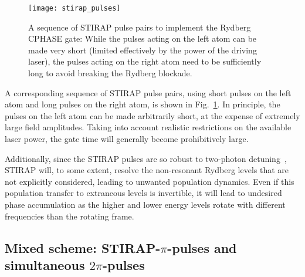 \begin{figure}[tb]
    \centering\texttt{[image: stirap\_pulses]}
  \caption{%
    A sequence of STIRAP pulse pairs to implement the
    Rydberg CPHASE gate: While the pulses acting on the left atom
    can be made very short (limited effectively by the power of the driving
    laser), the pulses acting on the right atom need to be sufficiently long to
    avoid breaking the Rydberg blockade.
  }
  \label{fig:Stirap}
\end{figure}
A corresponding  sequence of STIRAP pulse pairs, using short pulses on the left
atom and long pulses on the right atom,  is shown in Fig.~\ref{fig:Stirap}.
In principle, the pulses on the left atom can be made arbitrarily short,
at the expense of extremely large field amplitudes. Taking into account
realistic restrictions on the available laser power, the gate time will
generally become prohibitively large.

Additionally, since the STIRAP pulses are so robust to two-photon
detuning~\cite{grigoryan2001adiabatic}, STIRAP will, to some extent, resolve the
non-resonant Rydberg levels that are not explicitly considered, leading to
unwanted population dynamics. Even if this population transfer to extraneous
levels is invertible, it will lead to undesired phase accumulation as the higher
and lower energy levels rotate with different frequencies than the rotating
frame.

\subsection{Mixed scheme: STIRAP-$\pi$-pulses and simultaneous
  $2\pi$-pulses}
\label{subsec:RydMixed}

